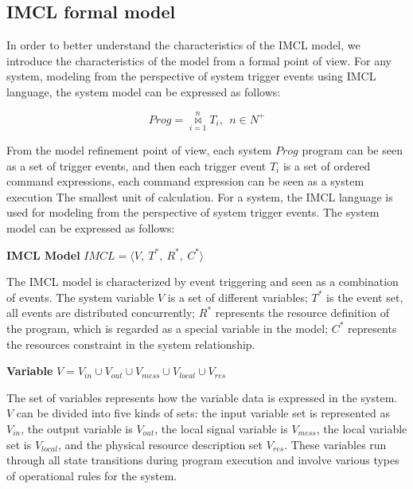 \subsection{IMCL formal model}
In order to better understand the characteristics of the IMCL model, we introduce the characteristics of the model from a formal point of view. For any system, modeling from the perspective of system trigger events using IMCL language, the system model can be expressed as follows:

\begin{displaymath}
Prog = \overset{n}{\underset{i=1}{\bowtie}} T_{i}, \ \ n \in N^{+}
\end{displaymath}

From the model refinement point of view, each system $Prog$ program can be seen as a set of trigger events, and then each trigger event $T_i$ is a set of ordered command expressions, each command expression can be seen as a system execution The smallest unit of calculation. For a system, the IMCL language is used for modeling from the perspective of system trigger events. The system model can be expressed as follows:

\begin{definition} \textbf{IMCL Model} $IMCL = \langle V, \ T^{*}, \ R^{*}, \ C^{*}\rangle$
\end{definition}
The IMCL model is characterized by event triggering and seen as a combination of events. The system variable $V$ is a set of different variables; $T^{*}$ is the event set, all events are distributed concurrently; $R^{*}$ represents the resource definition of the program, which is regarded as a special variable in the model; $C^{*}$ represents the resources constraint in the system relationship.

\begin{definition} \textbf{Variable} $V = V_{in} \cup V_{out} \cup V_{mess} \cup V_{local} \cup V_{res}$
\end{definition}
The set of variables represents how the variable data is expressed in the system. $V$ can be divided into five kinds of sets: the input variable set is represented as $V_{in}$, the output variable is $V_{out}$, the local signal variable is $V_{mess}$, the local variable set is $V_{local}$, and the physical resource description set $V_{res}$. These variables run through all state transitions during program execution and involve various types of operational rules for the system.

